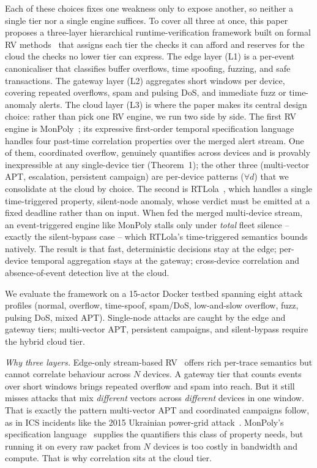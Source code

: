 \documentclass[runningheads]{llncs}
\begin{document}
Each of these choices fixes one weakness only to expose another, so
neither a single tier nor a single engine suffices.  To cover all
three at once, this paper proposes a three-layer hierarchical
runtime-verification framework built on formal RV
methods~\cite{leucker2009brief,falcone2021taxonomy} that assigns
each tier the checks it can afford and reserves for the cloud the
checks no lower tier can express.  The edge
layer (L1) is a per-event canonicaliser that classifies buffer
overflows, time spoofing, fuzzing, and safe transactions.  The
gateway layer (L2) aggregates short windows per device, covering
repeated overflows, spam and pulsing DoS, and immediate fuzz or
time-anomaly alerts.  The cloud layer (L3) is where the paper makes its
central design choice: rather than pick one RV engine, we run two side by
side.  The first RV engine is MonPoly~\cite{monpoly2014};
its expressive first-order temporal specification language handles four
past-time correlation properties over the merged alert stream.  One of
them, coordinated overflow, genuinely quantifies across devices and is
provably inexpressible at any single-device tier (Theorem~1); the other
three (multi-vector APT, escalation, persistent campaign) are per-device
patterns ($\forall d$) that we consolidate at the cloud by choice.  The second is
RTLola~\cite{rtlola2019}, which handles a single time-triggered
property, silent-node anomaly, whose verdict must be emitted at a fixed
deadline rather than on input.  When fed the merged multi-device stream, an
event-triggered engine like MonPoly stalls only under \emph{total} fleet
silence -- exactly the silent-bypass case -- which RTLola's time-triggered
semantics bounds natively.  The result is that fast, deterministic decisions stay at the edge; per-device temporal
aggregation stays at the gateway; cross-device correlation and
absence-of-event detection live at the cloud.

We evaluate the framework on a 15-actor Docker testbed spanning
eight attack profiles (normal, overflow, time-spoof, spam/DoS,
low-and-slow overflow, fuzz, pulsing DoS, mixed APT).  Single-node
attacks are caught by the edge and gateway tiers; multi-vector
APT, persistent campaigns, and silent-bypass require the hybrid
cloud tier.

\emph{Why three layers.}  Edge-only stream-based RV~\cite{rtlola2019,tessla2018,pike2017copilot}
offers rich per-trace semantics but cannot correlate behaviour
across $N$ devices.  A gateway tier that counts events over short
windows brings repeated overflow and spam into reach.  But it
still misses attacks that mix \emph{different} vectors across
\emph{different} devices in one window.  That is exactly the
pattern multi-vector APT and coordinated campaigns follow, as in
ICS incidents like the 2015 Ukrainian power-grid
attack~\cite{ukraine2015}.
MonPoly's specification language~\cite{monpoly2014} supplies the
quantifiers this class of property needs, but running it on every
raw packet from $N$ devices is too costly in bandwidth and
compute.  That is why correlation sits at the cloud tier.
\end{document}
